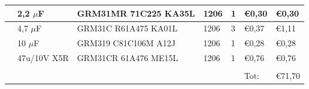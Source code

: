 \documentclass[11pt,a4paper]{article}
\begin{document}
\begin{longtable}{|p{}|p{}||p{}|p{}||p{}|p{}||p{}|}
         & 2,2 $\mu$F & GRM31MR 71C225 KA35L & 1206 & 1 & \euro 0,30 & \euro 0,30 \\ \hline
         & 4,7 $\mu$F & GRM31C R61A475 KA01L & 1206 & 3 & \euro 0,37 & \euro 1,11 \\ \hline
         & 10 $\mu$F & GRM319 C81C106M A12J & 1206 & 1 & \euro 0,28 & \euro 0,28 \\ \hline
         & 47u/10V X5R & GRM31CR 61A476 ME15L & 1206 & 1 & \euro 0,76 & \euro 0,76 \\ \hline
         &  &  &  &  &  &  \\ \hline
         &  &  &  &  & Tot: & \euro 71,70 \\ \hline
    \end{longtable}
\end{document}
